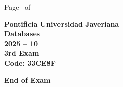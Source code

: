 \documentclass[11pt, addpoints]{exam}\usepackage[utf8]{inputenc}
\begin{document}
\begin{coverpages}
\begin{center}
			\vspace{3mm}
			\leavevmode \hspace{5mm} 
		\end{center}
	\end{coverpages}

	\footer{} {Page \thepage\ of \numpages} {}

	\centering
	\textbf{\Large Pontificia Universidad Javeriana}\\
	\textbf{\Large Databases} \\
	\textbf{\large 2025 -- 10} \\
	\textbf{\large 3rd Exam} \\
	\textbf{Code: 33CE8F}


	\begin{questions}
		
		
		
		
		
		
		
		
		
		
		
		
		
		
		
		
		
		
		
		
	\end{questions}

	\vspace{5mm}
	\noindent \textbf{End of Exam}
\end{document}
